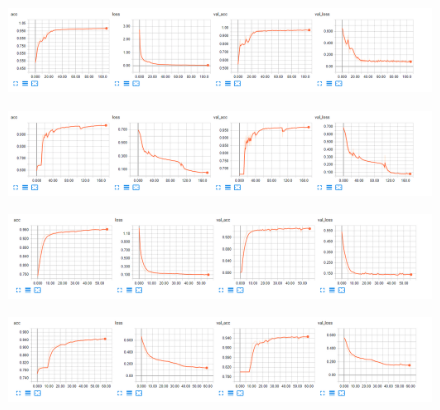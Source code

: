 \documentclass[USenglish]{ifimaster}  %
\begin{document}
\begin{figure}[ht]
    \centering
    \includegraphics[width=1.1\textwidth]{bilder/Custom_1_residual_training_results.png}
    \label{fig:custom_1_residual_result}
\end{figure}

\begin{figure}[ht]
    \centering
    \includegraphics[width=1.1\textwidth]{bilder/Custom_1_sequential_training_results.png}
    \label{fig:custom_1_sequential_result}
\end{figure}

\begin{figure}[ht]
    \centering
    \includegraphics[width=1.1\textwidth]{bilder/Custom_2_residual_training_results.png}
    \label{fig:custom_2_residual_result}
\end{figure}

\begin{figure}[ht]
    \centering
    \includegraphics[width=1.1\textwidth]{bilder/Custom_2_sequential_training_results.png}
    \label{fig:custom_2_sequential_result}
\end{figure}
\end{document}
